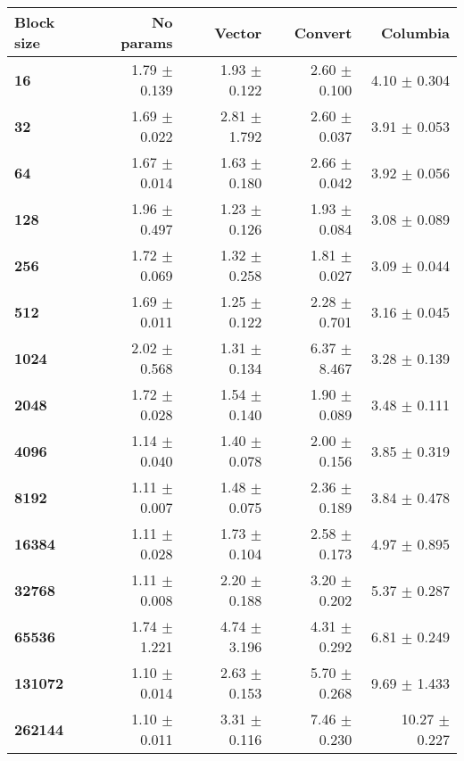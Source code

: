 \begin{tabular}{lrrrr}\toprule
\textbf{Block size}  & \textbf{No params} & \textbf{Vector} & \textbf{Convert} & \textbf{Columbia}\\\midrule
\textbf{16}  & 1.79 $\pm$ 0.139 & 1.93 $\pm$ 0.122 & 2.60 $\pm$ 0.100 & 4.10 $\pm$ 0.304\\
\textbf{32}  & 1.69 $\pm$ 0.022 & 2.81 $\pm$ 1.792 & 2.60 $\pm$ 0.037 & 3.91 $\pm$ 0.053\\
\textbf{64}  & 1.67 $\pm$ 0.014 & 1.63 $\pm$ 0.180 & 2.66 $\pm$ 0.042 & 3.92 $\pm$ 0.056\\
\textbf{128}  & 1.96 $\pm$ 0.497 & 1.23 $\pm$ 0.126 & 1.93 $\pm$ 0.084 & 3.08 $\pm$ 0.089\\
\textbf{256}  & 1.72 $\pm$ 0.069 & 1.32 $\pm$ 0.258 & 1.81 $\pm$ 0.027 & 3.09 $\pm$ 0.044\\
\textbf{512}  & 1.69 $\pm$ 0.011 & 1.25 $\pm$ 0.122 & 2.28 $\pm$ 0.701 & 3.16 $\pm$ 0.045\\
\textbf{1024}  & 2.02 $\pm$ 0.568 & 1.31 $\pm$ 0.134 & 6.37 $\pm$ 8.467 & 3.28 $\pm$ 0.139\\
\textbf{2048}  & 1.72 $\pm$ 0.028 & 1.54 $\pm$ 0.140 & 1.90 $\pm$ 0.089 & 3.48 $\pm$ 0.111\\
\textbf{4096}  & 1.14 $\pm$ 0.040 & 1.40 $\pm$ 0.078 & 2.00 $\pm$ 0.156 & 3.85 $\pm$ 0.319\\
\textbf{8192}  & 1.11 $\pm$ 0.007 & 1.48 $\pm$ 0.075 & 2.36 $\pm$ 0.189 & 3.84 $\pm$ 0.478\\
\textbf{16384}  & 1.11 $\pm$ 0.028 & 1.73 $\pm$ 0.104 & 2.58 $\pm$ 0.173 & 4.97 $\pm$ 0.895\\
\textbf{32768}  & 1.11 $\pm$ 0.008 & 2.20 $\pm$ 0.188 & 3.20 $\pm$ 0.202 & 5.37 $\pm$ 0.287\\
\textbf{65536}  & 1.74 $\pm$ 1.221 & 4.74 $\pm$ 3.196 & 4.31 $\pm$ 0.292 & 6.81 $\pm$ 0.249\\
\textbf{131072}  & 1.10 $\pm$ 0.014 & 2.63 $\pm$ 0.153 & 5.70 $\pm$ 0.268 & 9.69 $\pm$ 1.433\\
\textbf{262144} & 1.10 $\pm$ 0.011 & 3.31 $\pm$ 0.116 & 7.46 $\pm$ 0.230 & 10.27 $\pm$ 0.227\\
\bottomrule
\end{tabular}
